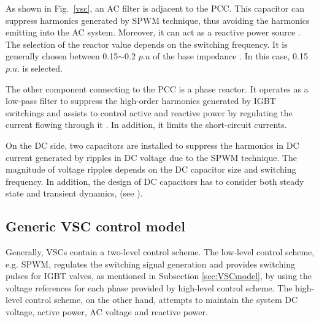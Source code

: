 \documentclass[conference]{IEEEtran}
\begin{document}
As shown in Fig.~\ref{vsc}, an AC filter is adjacent to the PCC. This capacitor can suppress harmonics generated by SPWM technique, thus avoiding the harmonics emitting into the AC system. Moreover, it can act as a reactive power source \cite{Naveed}\cite{Rokib}. The selection of the reactor value depends on the switching frequency. It is generally chosen between 0.15$\sim$0.2 $p.u$ of the base impedance \cite{Shire}. In this case, 0.15 $p.u.$ is selected. 

The other component connecting to the PCC is a phase reactor. It operates as a low-pass filter to suppress the high-order harmonics generated by IGBT switchings and assists to control active and reactive power by regulating the current flowing through it \cite{Naveed}\cite{Rokib}. In addition, it limits the short-circuit currents. 

On the DC side, two capacitors are installed to suppress the harmonics in DC current generated by ripples in DC voltage due to the SPWM technique. The magnitude of voltage ripples depends on the DC capacitor size and switching frequency. In addition, the design of DC capacitors has to consider both steady state and transient dynamics, (see \cite{Naveed}). 

%
\subsection{Generic VSC control model\label{sec:VSCcontrol}}
Generally, VSCs contain a two-level control scheme. The low-level control scheme, e.g. SPWM, regulates the switching signal generation and provides switching pulses for IGBT valves, as mentioned in Subsection \ref{sec:VSCmodel}, by using the voltage references for each phase provided by high-level control scheme. The high-level control scheme, on the other hand, attempts to maintain the system DC voltage, active power, AC voltage and reactive power. 
\end{document}
